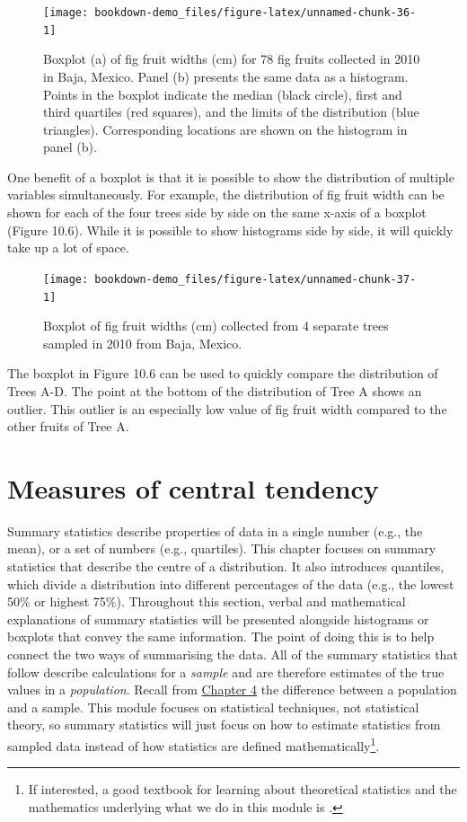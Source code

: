\documentclass[
]{scrbook}
\begin{document}
\begin{figure}
\texttt{[image: bookdown-demo\_files/figure-latex/unnamed-chunk-36-1]} \caption{Boxplot (a) of fig fruit widths (cm) for 78 fig fruits collected in 2010 in Baja, Mexico. Panel (b) presents the same data as a histogram. Points in the boxplot indicate the median (black circle), first and third quartiles (red squares), and the limits of the distribution (blue triangles). Corresponding locations are shown on the histogram in panel (b).}\label{fig:unnamed-chunk-36}
\end{figure}

One benefit of a boxplot is that it is possible to show the distribution of multiple variables simultaneously.
For example, the distribution of fig fruit width can be shown for each of the four trees side by side on the same x-axis of a boxplot (Figure 10.6).
While it is possible to show histograms side by side, it will quickly take up a lot of space.

\begin{figure}
\texttt{[image: bookdown-demo\_files/figure-latex/unnamed-chunk-37-1]} \caption{Boxplot of fig fruit widths (cm) collected from 4 separate trees sampled in 2010 from Baja, Mexico.}\label{fig:unnamed-chunk-37}
\end{figure}

The boxplot in Figure 10.6 can be used to quickly compare the distribution of Trees A-D.
The point at the bottom of the distribution of Tree A shows an outlier.
This outlier is an especially low value of fig fruit width compared to the other fruits of Tree A.

\hypertarget{Chapter_11}{%
\chapter{Measures of central tendency}\label{Chapter_11}}

Summary statistics describe properties of data in a single number (e.g., the mean), or a set of numbers (e.g., quartiles).
This chapter focuses on summary statistics that describe the centre of a distribution.
It also introduces quantiles, which divide a distribution into different percentages of the data (e.g., the lowest 50\% or highest 75\%).
Throughout this section, verbal and mathematical explanations of summary statistics will be presented alongside histograms or boxplots that convey the same information.
The point of doing this is to help connect the two ways of summarising the data.
All of the summary statistics that follow describe calculations for a \emph{sample} and are therefore estimates of the true values in a \emph{population}.
Recall from \protect\hyperlink{Chapter_4}{Chapter 4} the difference between a population and a sample.
This module focuses on statistical techniques, not statistical theory, so summary statistics will just focus on how to estimate statistics from sampled data instead of how statistics are defined mathematically\footnote{If interested, a good textbook for learning about theoretical statistics and the mathematics underlying what we do in this module is \citet{Miller2004}.}.
\end{document}

